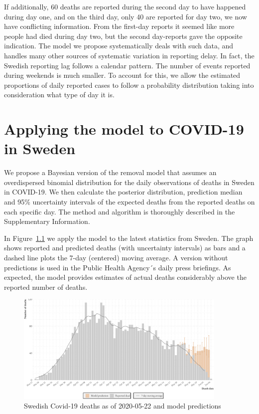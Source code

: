 \documentclass[a4paper,11pt,article,oneside,openany,american]{memoir}
\begin{document}
If additionally, 60 deaths are reported during the second day to have happened during day one, and on the third day, only 40 are reported for day two, we now have conflicting information. From the first-day reports it seemed like more people had died during day two, but the second day-reports gave the opposite indication. The model we propose systematically deals with such data, and handles many other sources of systematic variation in reporting delay. In fact, the Swedish reporting lag follows a calendar pattern. The number of events reported during weekends is much smaller. To account for this, we allow the estimated proportions of daily reported cases to follow a probability distribution taking into consideration what type of day it is.

\chapter{Applying the model to COVID-19 in Sweden}
We propose a Bayesian version of the removal model that assumes an overdispersed binomial distribution for the daily observations of deaths in Sweden in COVID-19. We then calculate the posterior distribution, prediction median and 95\% uncertainty intervals of the expected deaths from the reported deaths on each specific day. The method and algorithm is thoroughly described in the Supplementary Information.

In Figure~\ref{fig:latest_prediction} we apply the model to the latest statistics from Sweden. The graph shows reported and predicted deaths (with uncertainty intervals) as bars and a dashed line plots the 7-day (centered) moving average. A version without predictions is used in the Public Health Agency´s daily press briefings. As expected, the model provides estimates of actual deaths considerably above the reported number of deaths.

\begin{figure}
    \centering
    \includegraphics[width=0.9\textwidth]{../plots/latest_prediction}
    \caption{Swedish Covid-19 deaths as of 2020-05-22 and model predictions}
    \label{fig:latest_prediction}
\end{figure}
\end{document}
